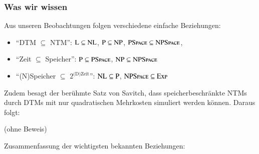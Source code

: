 \documentclass[onlymath]{beamer}
\begin{document}
\begin{frame}\frametitle{Was wir wissen}

Aus unseren Beobachtungen folgen verschiedene einfache Beziehungen:
\begin{itemize}
\item \alert{"`DTM $\subseteq$ NTM"':}
	${\textsc{L}}\subseteq {\textsc{NL}}$,
	${\textsc{P}}\subseteq {\textsc{NP}}$,
	${\textsc{PSpace}}\subseteq {\textsc{NPSpace}}$,
\item \alert{"`Zeit $\subseteq$ Speicher"':}
	${\textsc{P}}\subseteq {\textsc{PSpace}}$,
	${\textsc{NP}}\subseteq {\textsc{NPSpace}}$
\item \alert{"`(N)Speicher $\subseteq$ $2^{\text{(D)Zeit}}$"':}
	${\textsc{NL}}\subseteq {\textsc{P}}$,
	${\textsc{NPSpace}}\subseteq {\textsc{Exp}}$
\end{itemize}\bigskip\pause

Zudem besagt der berühmte \alert{Satz von Savitch}, dass speicherbeschränkte NTMs durch DTMs mit nur quadratischen Mehrkosten simuliert werden können. Daraus folgt:


(ohne Beweis)\bigskip\pause

Zusammenfassung der wichtigsten bekannten Beziehungen:
\theobox{
\[\Scomplclass{L}\subseteq\Scomplclass{NL}\subseteq \Scomplclass{P}\subseteq\Scomplclass{NP}\subseteq\Scomplclass{PSpace}= \Scomplclass{NPSpace}\subseteq \Scomplclass{Exp}\subseteq \Scomplclass{NExp}\]
\vspace{-2.5ex}
}

\end{frame}
\end{document}
